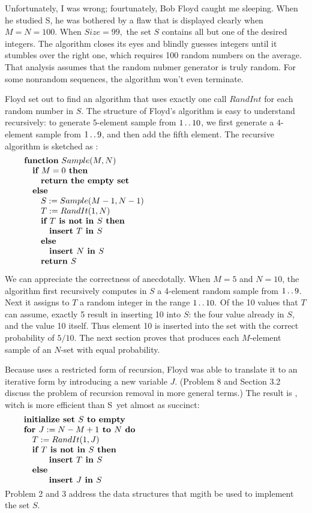 Unfortunately, I was wrong; fourtunately, Bob Floyd caught me sleeping. When he
studied \Alg S, he was bothered by a flaw that is displayed clearly
when $M=N=100.$ When $Size=99,$ the set $S$ contains all but one of the desired
integers. The algorithm closes its eyes and blindly guesses integers until it
stumbles over the right one, which requires 100 random numbers on the average.
That analysis assumes that the random nubmer generator is truly random. For some
nonrandom sequences, the algorithm won't even terminate.

Floyd set out to find an algorithm that uses exactly one call $RandInt$ for each
random number in $S$. The structure of Floyd's algorithm is easy to understand
recursively: to generate $5$-element sample from $1\mathinner{\ldotp\ldotp}10$, we first generate
a $4$-element sample from $1\mathinner{\ldotp\ldotp}9$, and then add the fifth element. The
recursive algorithm is sketched as :
$$\vbox{\let\par=\endgraf
\obeylines\sfcode`;=3000
{\bf function} $Sample(M, N)$
\quad {\bf if $M=0$ then}
\qquad {\bf return the empty set}
\quad {\bf else}
\qquad $S:=Sample(M-1, N-1)$
\qquad $T:=RandIt(1,N)$
\qquad {\bf if $T$ is not in $S$ then}
\qquad\quad {\bf insert $T$ in $S$}
\qquad {\bf else}
\qquad\quad {\bf insert $N$ in $S$}
\qquad {\bf return $S$}
}$$

We can appreciate the correctness of  anecdotally. When
$M=5$ and $N=10$, the algorithm first recursively computes in $S$ a 4-element
random sample from $1\mathinner{\ldotp\ldotp}9$. Next it assigns to $T$ a random integer in the
range $1\mathinner{\ldotp\ldotp}10.$ Of the 10 values that $T$ can assume, exactly 5 result in
inserting 10 into $S$: the four value already in $S$, and the value 10 itself.
Thus element 10 is inserted into the set with the correct probability of $5/10$.
The next section proves that  produces each $M$-element sample
of an $N$-set with equal probability.

Because  uses a restricted form of recursion, Floyd was able to
translate it to an iterative form by introducing a new variable $J$. (Problem 8
and Section 3.2 discuss the problem of recursion removal in more general terms.)
The result is , witch is more efficient than \Alg S\ yet almost as
succinct:
$$\vbox{\let\par=\endgraf
\obeylines\sfcode`;=3000
{\bf initialize set $S$ to empty}
{\bf for $J:=N-M+1$ to $N$ do}
\quad $T:=RandIt(1,J)$
\quad {\bf if $T$ is not in $S$ then}
\qquad\quad {\bf insert $T$ in $S$}
\quad {\bf else}
\qquad\quad {\bf insert $J$ in $S$}
}$$
Problem 2 and 3 address the data structures that mgith be used to implement
the set $S$.

